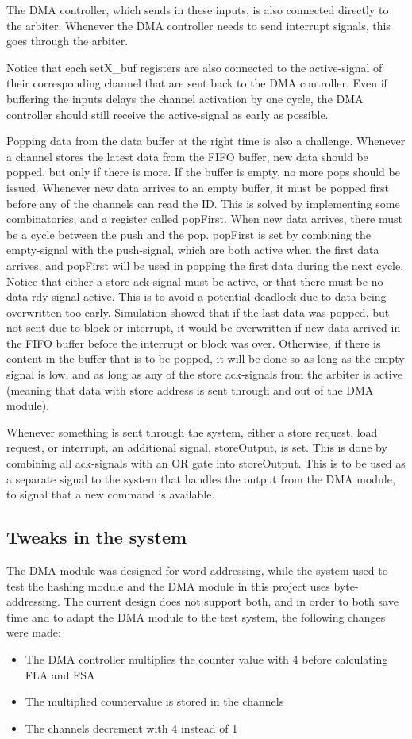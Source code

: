 \begin{appendix}
The DMA controller, which sends in these inputs, is also connected directly to the arbiter.
Whenever the DMA controller needs to send interrupt signals, this goes through the arbiter.

Notice that each setX\_buf registers are also connected to the active-signal of their corresponding channel that are sent back to the DMA controller.
Even if buffering the inputs delays the channel activation by one cycle, the DMA controller should still receive the active-signal as early as possible.

Popping data from the data buffer at the right time is also a challenge.
Whenever a channel stores the latest data from the FIFO buffer, new data should be popped, but only if there is more.
If the buffer is empty, no more pops should be issued.
Whenever new data arrives to an empty buffer, it must be popped first before any of the channels can read the ID.
This is solved by implementing some combinatorics, and a register called popFirst.
When new data arrives, there must be a cycle between the push and the pop.
popFirst is set by combining the empty-signal with the push-signal, which are both active when the first data arrives, and popFirst will be used in popping the first data during the next cycle.
Notice that either a store-ack signal must be active, or that there must be no data-rdy signal active.
This is to avoid a potential deadlock due to data being overwritten too early.
Simulation showed that if the last data was popped, but not sent due to block or interrupt, it would be overwritten if new data arrived in the FIFO buffer before the interrupt or block was over.
Otherwise, if there is content in the buffer that is to be popped, it will be done so as long as the empty signal is low, and as long as any of the store ack-signals from the arbiter is active (meaning that data with store address is sent through and out of the DMA module).

Whenever something is sent through the system, either a store request, load request, or interrupt, an additional signal, storeOutput, is set.
This is done by combining all ack-signals with an OR gate into storeOutput.
This is to be used as a separate signal to the system that handles the output from the DMA module, to signal that a new command is available.

\subsection{Tweaks in the system}
The DMA module was designed for word addressing, while the system used to test the hashing module and the DMA module in this project uses byte-addressing.
The current design does not support both, and in order to both save time and to adapt the DMA module to the test system, the following changes were made:
\begin{itemize}
    \item The DMA controller multiplies the counter value with 4 before calculating FLA and FSA
    \item The multiplied countervalue is stored in the channels
    \item The channels decrement with 4 instead of 1 
\end{itemize}


\end{appendix}
